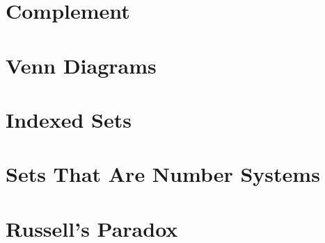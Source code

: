\documentclass[10pt]{article}
\theoremstyle{definition}
\begin{document}
    \section{Complement}

    \section{Venn Diagrams}

    \section{Indexed Sets}

    \section{Sets That Are Number Systems}

    \section{Russell's Paradox}

    
\end{document}
